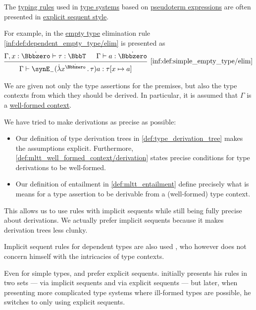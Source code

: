 \begin{remark}\label{rem:dependent_type_rule_sequents}
  The \hyperref[con:typing_rule]{typing rules} used in \hyperref[def:abstract_type_system]{type systems} based on \hyperref[con:pseudoterm_expression]{pseudoterm expressions} are often presented in \hyperref[rem:natural_deduction_explicit_sequents]{explicit sequent style}.

  For example, in \cite[\S A.2.7]{UnivalentFoundationsProgram2013HoTT} the \hyperref[def:dependent_empty_type]{empty type} elimination rule \ref{inf:def:dependent_empty_type/elim} is presented as
  \begin{equation*}
    \begin{prooftree}
      \hypo{ \Gamma, x: \syn\Bbbzero \vdash \tau: \BbbT }
      \hypo{ \Gamma \vdash a: \syn\Bbbzero }
      \infer2[\ref{inf:def:simple_empty_type/elim}]{ \Gamma \vdash \synE_- (\qabs {x^{\syn\Bbbzero}} \tau) a: \tau[x \mapsto a] }
    \end{prooftree}
  \end{equation*}

  We are given not only the type assertions for the premises, but also the type contexts from which they should be derived. In particular, it is assumed that \( \Gamma \) is a \hyperref[rem:well_formed_context]{well-formed context}.

  We have tried to make derivations as precise as possible:
  \begin{itemize}
    \item Our definition of type derivation trees in \cref{def:type_derivation_tree} makes the assumptions explicit. Furthermore, \cref{def:mltt_well_formed_context/derivation} states precise conditions for type derivations to be well-formed.

    \item Our definition of entailment in \cref{def:mltt_entailment} define precisely what is means for a type assertion to be derivable from a (well-formed) type context.
  \end{itemize}

  This allows us to use rules with implicit sequents while still being fully precise about derivations. We actually prefer implicit sequents because it makes derivation trees less clunky.
\end{remark}
\begin{comments}
  \item Implicit sequent rules for dependent types are also used , who however does not concern himself with the intricacies of type contexts.

  \item Even for simple types,  and  prefer explicit sequents.  initially presents his rules in two sets --- via implicit sequents and via explicit sequents --- but later, when presenting more complicated type systems where ill-formed types are possible, he switches to only using explicit sequents.
\end{comments}


